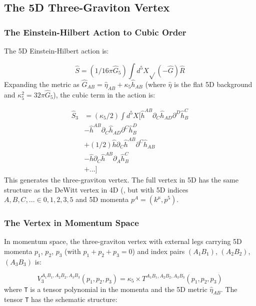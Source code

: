 \documentclass[aps,prd,preprint,superscriptaddress,longbibliography,floatfix]{revtex4-2}
\theoremstyle{remark}
\begin{document}
\subsection{The 5D Three-Graviton Vertex}


\subsubsection{The Einstein-Hilbert Action to Cubic Order}

The 5D Einstein-Hilbert action is:


\begin{equation}
    \hat{S} = (1/16\pi\hat{G}_{5}) \int d^{5}X \sqrt{}(-\hat{G}) \hat{R}
\end{equation}
Expanding the metric as $\hat{G}_{AB} = \hat{\eta}_{AB} + \kappa_{5} \hat{h}_{AB}$ (where $\hat{\eta}$ is the flat 5D background and $\kappa_{5}^{2} = 32\pi\hat{G}_{5}$), the cubic term in the action is:


\begin{align}
    \hat{S}_{3} &= (\kappa_{5}/2) \int d^{5}X [\hat{h}^{AB} \partial_C \hat{h}_{AD} \partial^D \hat{h}_B^C \\
    & - \hat{h}^{AB} \partial_C \hat{h}_{AD} \partial^C \hat{h}_B^D \\
    & + (1/2) \hat{h} \partial_C \hat{h}^{AB} \partial^C \hat{h}_{AB} \\
    & - \hat{h} \partial_C \hat{h}^{AB} \partial_A \hat{h}_B^C \\
    & + ...]
\end{align}
This generates the three-graviton vertex. The full vertex in 5D has the same structure as the DeWitt vertex in 4D (\cite{DeWitt1967}, \cite{Sannan1986} but with 5D indices $A, B, C, ... \in {0, 1, 2, 3, 5}$ and 5D momenta $p^A = (k^\mu, p^5)$.


\subsubsection{The Vertex in Momentum Space}

In momentum space, the three-graviton vertex with external legs carrying 5D momenta $p_{1}$, $p_{2}$, $p_{3}$ (with $p_{1} + p_{2} + p_{3} = 0$) and index pairs $(A_{1}B_{1})$, $(A_{2}B_{2})$, $(A_{3}B_{3})$ is:


\begin{equation}
    V_{3}^{A_{1}B_{1}, A_{2}B_{2}, A_{3}B_{3}}(p_{1}, p_{2}, p_{3}) = \kappa_{5} \times T^{A_{1}B_{1}, A_{2}B_{2}, A_{3}B_{3}}(p_{1}, p_{2}, p_{3})
\end{equation}
where \texttt{T} is a tensor polynomial in the momenta and the 5D metric $\hat{\eta}_{AB}$. The tensor \texttt{T} has the schematic structure:
\end{document}
